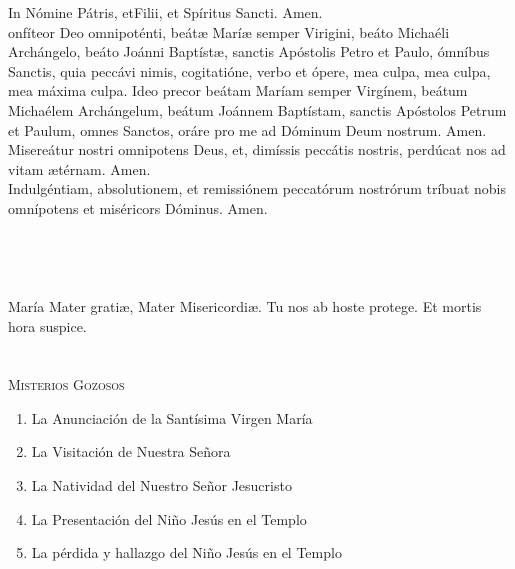 \documentclass[9pt]{article}
\date{Valladolid (España), \monthyeardate\today}
\begin{document}
\begin{multicols*}{2}

    In Nómine Pátris, et{\redcross}Filii, et Spíritus Sancti. Amen.\\

    onfíteor Deo omnipoténti, beát{\ae} Marí{\ae} semper Virigini, beáto Michaéli Archángelo, beáto Joánni Baptíst{\ae}, 
    sanctis Apóstolis Petro et Paulo, ómníbus Sanctis, quia peccávi nimis, cogitatióne, verbo et ópere, mea culpa, mea culpa, 
    mea máxima culpa. Ideo precor beátam     Maríam semper Virgínem, beátum Michaélem Archángelum, beátum Joánnem Baptístam, 
    sanctis Apóstolos Petrum et Paulum, omnes Sanctos, oráre pro me ad Dóminum Deum nostrum. Amen.\\
    Misereátur nostri omnipotens Deus, et, dimíssis peccátis nostris, perdúcat nos ad vitam {\ae}térnam. Amen.\\
    Indulgéntiam, absolutionem, et remissiónem peccatórum nostrórum tríbuat nobis omnípotens et miséricors Dóminus. Amen.\\

    \\
    \\
    \\\\
    María Mater gratiæ, Mater Misericordiæ. Tu nos ab hoste protege. Et mortis hora suspice.\\
    
    \\

    \small{}\\
    \textsc{Misterios Gozosos}
    \begin{enumerate}
        \item La Anunciación de la Santísima Virgen María
        \item La Visitación de Nuestra Señora
        \item La Natividad del Nuestro Señor Jesucristo
        \item La Presentación del Niño Jesús en el Templo
        \item La pérdida y hallazgo del Niño Jesús en el Templo
    \end{enumerate}


\end{multicols*}
\end{document}
